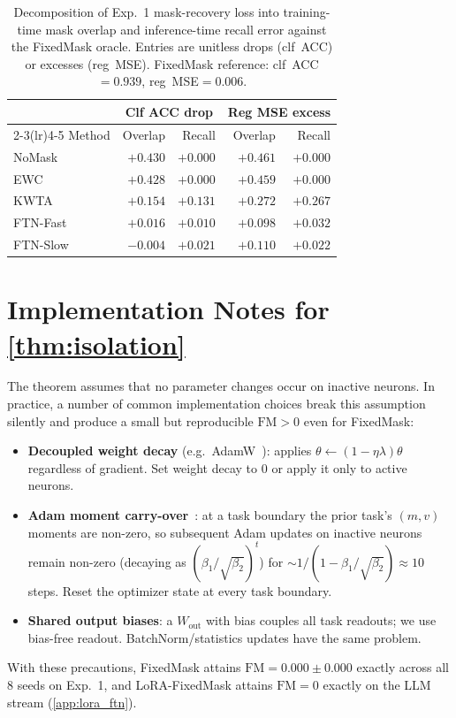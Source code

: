 \documentclass{article}
\theoremstyle{plain}
\theoremstyle{remark}
\begin{document}
\begin{table}[h]
\caption{Decomposition of Exp.~1 mask-recovery loss into training-time mask overlap and inference-time recall error against the FixedMask oracle. Entries are unitless drops (clf~ACC) or excesses (reg~MSE). FixedMask reference: clf~ACC$=0.939$, reg~MSE$=0.006$.}
\label{tab:overlap_recall}
\vskip 0.05in
\begin{center}\begin{small}
\begin{tabular}{lrrrr}
\toprule
 & \multicolumn{2}{c}{Clf ACC drop} & \multicolumn{2}{c}{Reg MSE excess} \\
\cmidrule(lr){2-3}\cmidrule(lr){4-5}
Method & Overlap & Recall & Overlap & Recall \\
\midrule
NoMask    & $+0.430$ & $+0.000$ & $+0.461$ & $+0.000$ \\
EWC       & $+0.428$ & $+0.000$ & $+0.459$ & $+0.000$ \\
KWTA      & $+0.154$ & $+0.131$ & $+0.272$ & $+0.267$ \\
FTN-Fast  & $+0.016$ & $+0.010$ & $+0.098$ & $+0.032$ \\
FTN-Slow  & $-0.004$ & $+0.021$ & $+0.110$ & $+0.022$ \\
\bottomrule
\end{tabular}
\end{small}\end{center}
\end{table}

\section{Implementation Notes for \cref{thm:isolation}}
\label{app:impl}
The theorem assumes that no parameter changes occur on inactive neurons. In practice, a number of common implementation choices break this assumption silently and produce a small but reproducible $\mathrm{FM}>0$ even for FixedMask:
\begin{itemize}
\item \textbf{Decoupled weight decay} (e.g.\ AdamW~\citep{loshchilov2019decoupled}): applies $\theta\leftarrow(1-\eta\lambda)\theta$ regardless of gradient. Set weight decay to $0$ or apply it only to active neurons.
\item \textbf{Adam moment carry-over}~\citep{kingma2015adam}: at a task boundary the prior task's $(m,v)$ moments are non-zero, so subsequent Adam updates on inactive neurons remain non-zero (decaying as $(\beta_1/\sqrt{\beta_2})^t$) for $\sim 1/(1-\beta_1/\sqrt{\beta_2})\approx 10$ steps. Reset the optimizer state at every task boundary.
\item \textbf{Shared output biases}: a $W_\mathrm{out}$ with bias couples all task readouts; we use bias-free readout. BatchNorm/statistics updates have the same problem.
\end{itemize}
With these precautions, FixedMask attains $\mathrm{FM}=0.000\pm 0.000$ exactly across all 8 seeds on Exp.~1, and LoRA-FixedMask attains $\mathrm{FM}=0$ exactly on the LLM stream (\cref{app:lora_ftn}).
\end{document}
